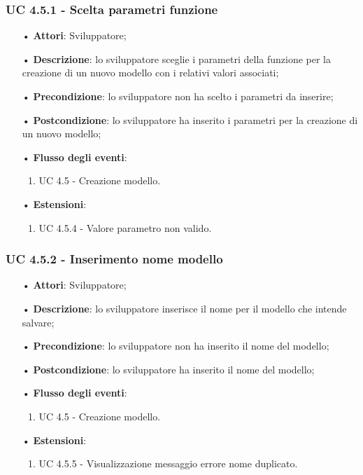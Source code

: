 \subsubsection{UC 4.5.1 - Scelta parametri funzione}
\begin{itemize}
\item[•]\textbf{Attori}: Sviluppatore;
\item[•]\textbf{Descrizione}: lo sviluppatore sceglie i parametri della funzione per la creazione di un nuovo modello con i relativi valori associati;
\item[•]\textbf{Precondizione}: lo sviluppatore non ha scelto i parametri da inserire;
\item[•]\textbf{Postcondizione}: lo sviluppatore ha inserito i parametri per la creazione di un nuovo modello;
\item[•]\textbf{Flusso degli eventi}: 
	\begin{enumerate}
	\item UC 4.5 - Creazione modello.
\end{enumerate}
\item[•] \textbf{Estensioni}: 
\begin{enumerate}
	\item UC 4.5.4 - Valore parametro non valido.
\end{enumerate}
\end{itemize}

\subsubsection{UC 4.5.2 - Inserimento nome modello}
\begin{itemize}
\item[•]\textbf{Attori}: Sviluppatore;
\item[•]\textbf{Descrizione}: lo sviluppatore inserisce il nome per il modello che intende salvare;
\item[•]\textbf{Precondizione}: lo sviluppatore non ha inserito il nome del modello;
\item[•]\textbf{Postcondizione}: lo sviluppatore ha inserito il nome del modello;
\item[•]\textbf{Flusso degli eventi}: 
	\begin{enumerate}
	\item UC 4.5 - Creazione modello.
\end{enumerate}
\item[•] \textbf{Estensioni}: 
\begin{enumerate}
	\item UC 4.5.5 - Visualizzazione messaggio errore nome duplicato.
\end{enumerate}
\end{itemize}

